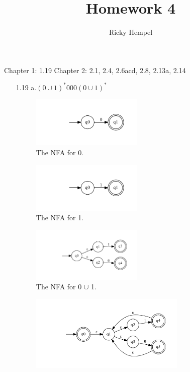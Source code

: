 \documentclass[10pt] {article}
\title{Homework 4 }
\author{Ricky Hempel}
\begin{document}
\maketitle
\begin{center}
Chapter 1: 1.19
Chapter 2: 2.1, 2.4, 2.6acd, 2.8, 2.13a, 2.14
\end{center}
\begin{enumerate}
\item[1.19]a.$(0 \cup 1)^{*}000(0 \cup 1)^*$
\begin{figure}[H]
\includegraphics[width=0.5\textwidth]{aa19.pdf}
\caption{The NFA for 0.}
\label{1}
\end{figure}
\begin{figure}[H]
\includegraphics[width=0.5\textwidth]{ab19.pdf}
\caption{The NFA for 1.}
\label{2}
\end{figure}
\begin{figure}[H]
\includegraphics[width=0.5\textwidth]{ac19.pdf}
\caption{The NFA for 0 $\cup$ 1.}
\label{3}
\end{figure}
\begin{figure}[H]
\includegraphics[width=0.7\textwidth]{ad19.pdf}

\end{figure}
\end{enumerate}
\end{document}
